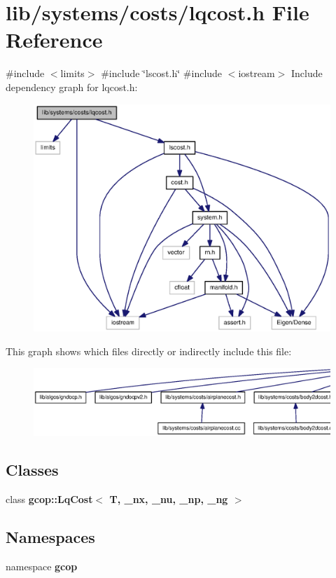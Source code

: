 \section{lib/systems/costs/lqcost.h \-File \-Reference}
\label{lqcost_8h}
{\ttfamily \#include $<$limits$>$}\*
{\ttfamily \#include \char`\"{}lscost.\-h\char`\"{}}\*
{\ttfamily \#include $<$iostream$>$}\*
\-Include dependency graph for lqcost.\-h\-:\nopagebreak
\begin{figure}[H]
\begin{center}
\leavevmode
\includegraphics[width=350pt]{lqcost_8h__incl}
\end{center}
\end{figure}
\-This graph shows which files directly or indirectly include this file\-:\nopagebreak
\begin{figure}[H]
\begin{center}
\leavevmode
\includegraphics[width=350pt]{lqcost_8h__dep__incl}
\end{center}
\end{figure}
\subsection*{\-Classes}
\begin{DoxyCompactItemize}
\item 
class {\bf gcop\-::\-Lq\-Cost$<$ T, \-\_\-nx, \-\_\-nu, \-\_\-np, \-\_\-ng $>$}
\end{DoxyCompactItemize}
\subsection*{\-Namespaces}
\begin{DoxyCompactItemize}
\item 
namespace {\bf gcop}
\end{DoxyCompactItemize}
